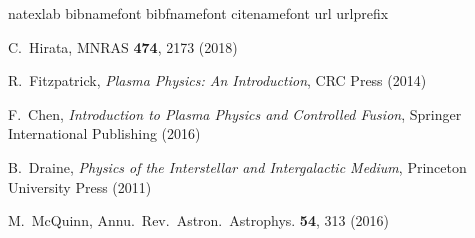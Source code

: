 \documentclass{article}
\begin{document}
\begin{thebibliography}{95}
\expandafter\ifx\csname natexlab\endcsname\relax\def\natexlab#1{#1}\fi
\expandafter\ifx\csname bibnamefont\endcsname\relax
  \def\bibnamefont#1{#1}\fi
\expandafter\ifx\csname bibfnamefont\endcsname\relax
  \def\bibfnamefont#1{#1}\fi
\expandafter\ifx\csname citenamefont\endcsname\relax
  \def\citenamefont#1{#1}\fi
\expandafter\ifx\csname url\endcsname\relax
  \def\url#1{\texttt{#1}}\fi
\expandafter\ifx\csname urlprefix\endcsname\relax\def\urlprefix{URL }\fi
\providecommand{\bibinfo}[2]{#2}
\providecommand{\eprint}[2][]{\url{#2}}
  
  
	C.~Hirata,
	MNRAS {\bf 474}, 2173 (2018)

	R.~Fitzpatrick,
	\textit{Plasma Physics: An Introduction},
	CRC Press (2014)

	F.~Chen,
	\textit{Introduction to Plasma Physics and Controlled Fusion},
	Springer International Publishing (2016)

	B.~Draine,
	\textit{Physics of the Interstellar and Intergalactic Medium},
	Princeton University Press (2011)

	M.~McQuinn,
	Annu.\ Rev.\ Astron.\ Astrophys. {\bf 54}, 313 (2016)
 

\end{thebibliography}
\end{document}
